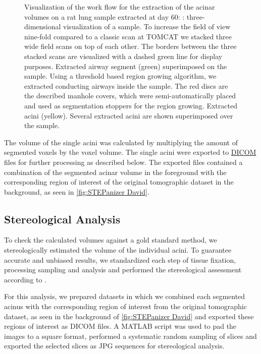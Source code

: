 \documentclass[twoside,paper=a4,abstract=true,english,DIV=calc]{scrartcl}
\newlength\imagescale		%
\begin{document}
\begin{figure}
{\begin{tikzpicture}[x=\imagescale,y=-\imagescale]
		\end{tikzpicture}%
		\label{subfig:extracted acini}%
		}
	\caption{Visualization of the work flow for the extraction of the acinar volumes on a rat lung sample extracted at day 60: %
		\protect{}: three-dimensional visualization of a sample.
		To increase the field of view nine-fold compared to a classic scan at TOMCAT we stacked three wide field scans on top of each other.
		The borders between the three stacked scans are visualized with a dashed green line for display purposes.
		\protect{} Extracted airway segment (green) superimposed on the sample.
		Using a threshold based region growing algorithm, we extracted conducting airways inside the sample.
		The red discs are the described manhole covers, which were semi-automatically placed and used as segmentation stoppers for the region growing.
		\protect{} Extracted acini (yellow).
		Several extracted acini are shown superimposed over the sample.}
	\label{fig:workflow}
\end{figure}

The volume of the single acini was calculated by multiplying the amount of segmented voxels by the voxel volume.
The single acini were exported to \href{https://secure.wikimedia.org/wikipedia/en/w/index.php?title=Digital_Imaging_and_Communications_in_Medicine&oldid=415023605}{DICOM} files for further processing as described below.
The exported files contained a combination of the segmented acinar volume in the foreground with the corresponding region of interest of the original tomographic dataset in the background, as seen in \autoref{fig:STEPanizer David}.

\subsection{Stereological Analysis}
To check the calculated volumes against a gold standard method, we stereologically estimated the volume of the individual acini.
To guarantee accurate and unbiased results, we standardized each step of tissue fixation, processing sampling and analysis and performed the stereological assessment according to \citet{Hsia2010}.

For this analysis, we prepared datasets in which we combined each segmented acinus with the corresponding region of interest from the original tomographic dataset, as seen in the background of \autoref{fig:STEPanizer David} and exported these regions of interest as DICOM files.
A MATLAB script was used to pad the images to a square format, performed a systematic random sampling of slices and exported the selected slices as JPG sequences for stereological analysis.
\end{document}
